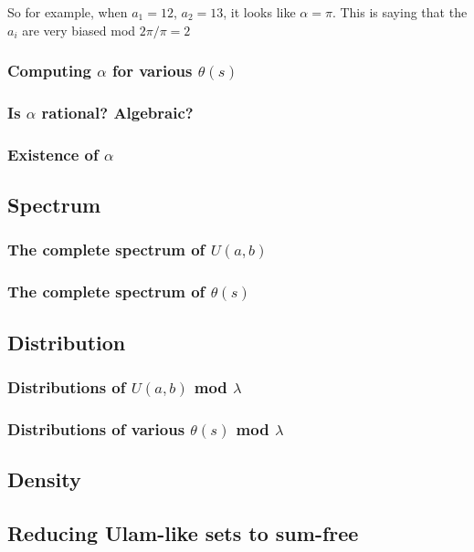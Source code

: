 \documentclass{article}
\theoremstyle{definition}
\theoremstyle{remark}
\numberwithin{equation}{section}
\begin{document}
So for example, when $a_1 = 12$, $a_2 = 13$, it looks like
$\alpha = \pi$.  This is saying that the $a_i$ are very biased mod
$2\pi/\pi = 2$


\subsubsection{Computing $\alpha$ for various $\theta(s)$}
\subsubsection{Is $\alpha$ rational?  Algebraic?}
\subsubsection{Existence of $\alpha$}

{\color{red}

\subsection{Spectrum}

\subsubsection{The complete spectrum of $U(a,b)$}
\subsubsection{The complete spectrum of $\theta(s)$}

\subsection{Distribution}

\subsubsection{Distributions of $U(a,b)$ mod $\lambda$}
\subsubsection{Distributions of various $\theta(s)$ mod $\lambda$}

\subsection{Density}

\subsection{Reducing Ulam-like sets to sum-free}

}
\end{document}
